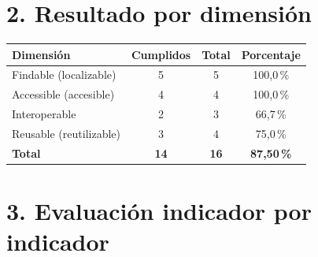 \documentclass[11pt,a4paper]{article}
\begin{document}
\section*{2. Resultado por dimensión}

\begin{center}
\begin{tabular}{lccc}
\toprule
\textbf{Dimensión} & \textbf{Cumplidos} & \textbf{Total} & \textbf{Porcentaje} \\
\midrule
Findable (localizable)     & 5 & 5 & 100,0\,\% \\
Accessible (accesible)     & 4 & 4 & 100,0\,\% \\
Interoperable              & 2 & 3 & 66,7\,\% \\
Reusable (reutilizable)    & 3 & 4 & 75,0\,\% \\
\midrule
\textbf{Total}             & \textbf{14} & \textbf{16} & \textbf{87,50\,\%} \\
\bottomrule
\end{tabular}
\end{center}

\section*{3. Evaluación indicador por indicador}
\end{document}
